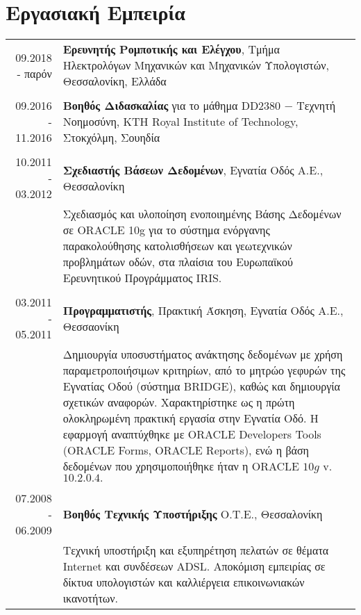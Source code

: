 \documentclass[a4paper,10pt,twoside]{article}
\begin{document}
\section{Εργασιακή Εμπειρία}

\begin{tabular}{rp{12cm}}
09.2018 - παρόν   & \textbf{Ερευνητής Ρομποτικής και Ελέγχου}, Τμήμα Ηλεκτρολόγων Μηχανικών και Μηχανικών Υπολογιστών, Θεσσαλονίκη, Ελλάδα\\
&\\
09.2016 - 11.2016 & \textbf{Βοηθός Διδασκαλίας} για το μάθημα DD2380 $-$ Τεχνητή Νοημοσύνη, KTH Royal Institute of Technology, Στοκχόλμη, Σουηδία\\
&\\
10.2011 - 03.2012 & \textbf{Σχεδιαστής Βάσεων Δεδομένων}, Εγνατία Οδός Α.Ε., Θεσσαλονίκη \\
                  & Σχεδιασμός και υλοποίηση ενοποιημένης Βάσης Δεδομένων σε ORACLE 10g για
                    το σύστημα ενόργανης παρακολούθησης κατολισθήσεων και γεωτεχνικών προβλημάτων οδών,
                    στα πλαίσια του Ευρωπαϊκού Ερευνητικού Προγράμματος IRIS. \\
&\\
03.2011 - 05.2011 & \textbf{Προγραμματιστής}, Πρακτική Άσκηση, Εγνατία Οδός Α.Ε., Θεσσαονίκη \\
                  & Δημιουργία υποσυστήματος ανάκτησης δεδομένων με χρήση παραμετροποιήσιμων
                    κριτηρίων, από το μητρώο γεφυρών της Εγνατίας Οδού (σύστημα BRIDGE), καθώς και
                    δημιουργία σχετικών αναφορών. Χαρακτηρίστηκε ως η πρώτη ολοκληρωμένη πρακτική
                    εργασία στην Εγνατία Οδό. Η εφαρμογή αναπτύχθηκε με ORACLE Developers Tools
                    (ORACLE Forms, ORACLE Reports), ενώ η βάση δεδομένων που χρησιμοποιήθηκε ήταν η ORACLE $10g$ v. $10.2.0.4.$\\
&\\
07.2008 - 06.2009 & \textbf{Βοηθός Τεχνικής Υποστήριξης} Ο.Τ.Ε., Θεσσαλονίκη\\
                  & Τεχνική υποστήριξη και εξυπηρέτηση πελατών σε θέματα Internet
                    και συνδέσεων ADSL. Αποκόμιση εμπειρίας σε δίκτυα υπολογιστών
                    και καλλιέργεια επικοινωνιακών ικανοτήτων.\\
\end{tabular} \\
\end{document}
